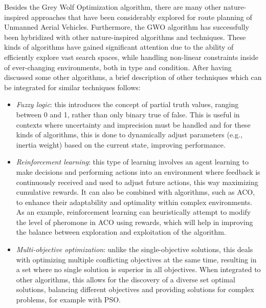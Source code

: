 \documentclass[conference]{IEEEtran}
\begin{document}
Besides the Grey Wolf Optimization algorithm, there are many other nature-inspired approaches that have been considerably explored for route planning of Unmanned Aerial Vehicles. Furthermore, the GWO algorithm has successfully been hybridized with other nature-inspired algorithms and techniques.
These kinds of algorithms have gained significant attention due to the ability of efficiently explore vast search spaces, while handling non-linear constraints inside of ever-changing environments, both in type and condition. After having discussed some other algorithms, a brief description of other techniques which can be integrated for similar techniques follows:
\begin{itemize}
    \item \textit{Fuzzy logic}: this introduces the concept of partial truth values, ranging between 0 and 1, rather than only binary true of false. This is useful in contexts where uncertainty and imprecision must be handled and for these kinds of algorithms, this is done to dynamically adjust parameters (e.g., inertia weight) based on the current state, improving performance.
    \item \textit{Reinforcement learning}: this type of learning involves an agent learning to make decisions and performing actions into an environment where feedback is continuously received and used to adjust future actions, this way maximizing cumulative rewards. It can also be combined with algorithms, such as ACO, to enhance their adaptability and optimality within complex environments. As an example, reinforcement learning can heuristically attempt to modify the level of pheromone in ACO using rewards, which will help in improving the balance between exploration and exploitation of the algorithm.
    \item \textit{Multi-objective optimization}: unlike the single-objective solutions, this deals with optimizing multiple conflicting objectives at the same time, resulting in a set where no single solution is superior in all objectives. When integrated to other algorithms, this allows for the discovery of a diverse set optimal solutions, balancing different objectives and providing solutions for complex problems, for example with PSO.
\end{itemize}
\end{document}

